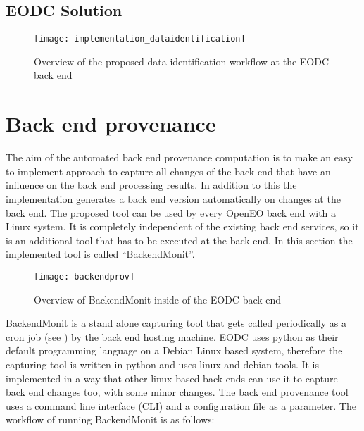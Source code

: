 \documentclass[draft,final]{vutinfth} %
\begin{document}
\subsection{EODC Solution}

 

\begin{figure}[h]
	\centering
	\texttt{[image: implementation\_dataidentification]}
	\caption{Overview of the proposed data identification workflow at the EODC back end}
	\label{fig:impldataid} %
\end{figure}

\section{Back end provenance}\label{Implementation:Back end provenance}
The aim of the automated back end provenance computation is to make an easy to implement approach to capture all changes of the back end that have an influence on the back end processing results. In addition to this the implementation generates a back end version automatically on changes at the back end. The proposed tool can be used by every OpenEO back end with a Linux system. It is completely independent of the existing back end services, so it is an additional tool that has to be executed at the back end. In this section the implemented tool is called “BackendMonit”. 
\begin{figure}[h]
	\centering
	\texttt{[image: backendprov]}
	\caption{Overview of BackendMonit inside of the EODC back end}
	\label{fig:backendprov} %
\end{figure}

BackendMonit is a stand alone capturing tool that gets called periodically as a cron job (see \cite{crontab}) by the back end hosting machine. EODC uses python as their default programming language on a Debian Linux based system, therefore the capturing tool is written in python and uses linux and debian tools. It is implemented in a way that other linux based back ends can use it to capture back end changes too, with some minor changes. The back end provenance tool uses a command line interface (CLI)  and a configuration file as a parameter. 
The workflow of running BackendMonit is as follows: 
\end{document}
